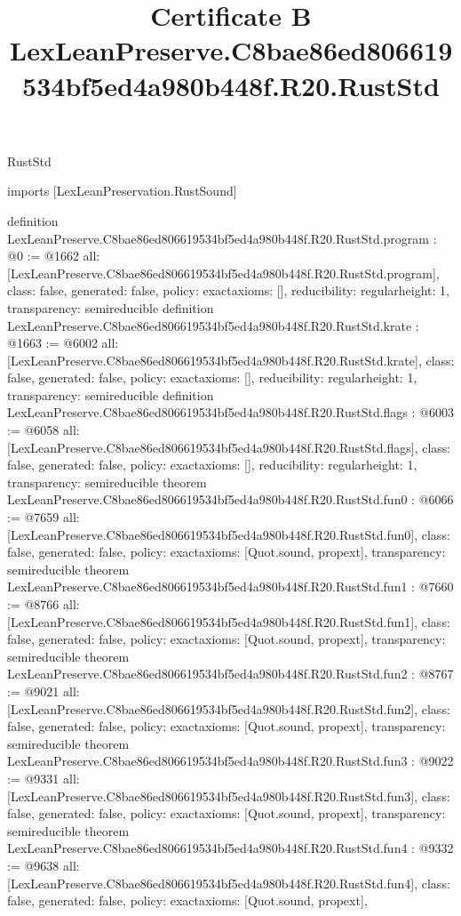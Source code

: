 \begin{lexlean}{RustStd}
\title{Certificate B LexLeanPreserve.C8bae86ed806619534bf5ed4a980b448f.R20.RustStd}
\begin{coremodule}
imports [LexLeanPreservation.RustSound]

definition LexLeanPreserve.C8bae86ed806619534bf5ed4a980b448f.R20.RustStd.program : @0 := @1662 {
  all: [LexLeanPreserve.C8bae86ed806619534bf5ed4a980b448f.R20.RustStd.program],
  class: false,
  generated: false,
  policy: exact{axioms: []},
  reducibility: regular{height: 1},
  transparency: semireducible
}
definition LexLeanPreserve.C8bae86ed806619534bf5ed4a980b448f.R20.RustStd.krate : @1663 := @6002 {
  all: [LexLeanPreserve.C8bae86ed806619534bf5ed4a980b448f.R20.RustStd.krate],
  class: false,
  generated: false,
  policy: exact{axioms: []},
  reducibility: regular{height: 1},
  transparency: semireducible
}
definition LexLeanPreserve.C8bae86ed806619534bf5ed4a980b448f.R20.RustStd.flags : @6003 := @6058 {
  all: [LexLeanPreserve.C8bae86ed806619534bf5ed4a980b448f.R20.RustStd.flags],
  class: false,
  generated: false,
  policy: exact{axioms: []},
  reducibility: regular{height: 1},
  transparency: semireducible
}
theorem LexLeanPreserve.C8bae86ed806619534bf5ed4a980b448f.R20.RustStd.fun0 : @6066 := @7659 {
  all: [LexLeanPreserve.C8bae86ed806619534bf5ed4a980b448f.R20.RustStd.fun0],
  class: false,
  generated: false,
  policy: exact{axioms: [Quot.sound, propext]},
  transparency: semireducible
}
theorem LexLeanPreserve.C8bae86ed806619534bf5ed4a980b448f.R20.RustStd.fun1 : @7660 := @8766 {
  all: [LexLeanPreserve.C8bae86ed806619534bf5ed4a980b448f.R20.RustStd.fun1],
  class: false,
  generated: false,
  policy: exact{axioms: [Quot.sound, propext]},
  transparency: semireducible
}
theorem LexLeanPreserve.C8bae86ed806619534bf5ed4a980b448f.R20.RustStd.fun2 : @8767 := @9021 {
  all: [LexLeanPreserve.C8bae86ed806619534bf5ed4a980b448f.R20.RustStd.fun2],
  class: false,
  generated: false,
  policy: exact{axioms: [Quot.sound, propext]},
  transparency: semireducible
}
theorem LexLeanPreserve.C8bae86ed806619534bf5ed4a980b448f.R20.RustStd.fun3 : @9022 := @9331 {
  all: [LexLeanPreserve.C8bae86ed806619534bf5ed4a980b448f.R20.RustStd.fun3],
  class: false,
  generated: false,
  policy: exact{axioms: [Quot.sound, propext]},
  transparency: semireducible
}
theorem LexLeanPreserve.C8bae86ed806619534bf5ed4a980b448f.R20.RustStd.fun4 : @9332 := @9638 {
  all: [LexLeanPreserve.C8bae86ed806619534bf5ed4a980b448f.R20.RustStd.fun4],
  class: false,
  generated: false,
  policy: exact{axioms: [Quot.sound, propext]},
}
\end{coremodule}
\end{lexlean}
